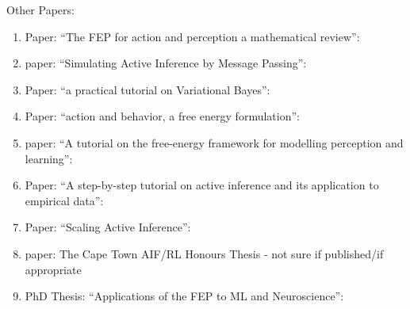 \documentclass[12pt, oneside]{article}
\begin{document}
Other Papers:
\begin{enumerate}
	\item Paper: ``The FEP for action and perception a mathematical review'': \textcite{FEP-Mathematical-Review}
	\item paper: ``Simulating Active Inference by Message Passing'': \textcite{Simulating-AIF-By-Message-Passing}
	\item Paper: ``a practical tutorial on Variational Bayes'': \textcite{Practical-Tutorial-Variational-Bayes}
	\item Paper: ``action and behavior, a free energy formulation'': \textcite{Action-Behaviour-FE}
	\item paper: ``A tutorial on the free-energy framework for modelling perception and learning'': \textcite{Tutorial-FEP-Modelling-Perception-Action}
	\item Paper: “A step-by-step tutorial on active inference and its application to empirical data'': \textcite{Step-by-Step-Tutorial-AIF-Empirical-Data}
	\item Paper: ``Scaling Active Inference'': \textcite{Scaling-AIF}
	\item paper: The Cape Town AIF/RL Honours Thesis - not sure if published/if appropriate
	\item PhD Thesis: ``Applications of the FEP to ML and Neuroscience'': \textcite{Applications-of-FEP-Machine-Learning-Neuroscience}
\end{enumerate}


\printbibliography
\end{document}
